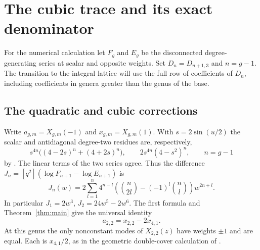 \section{The cubic trace and its exact denominator}\label{sec:arithmetic}
For the numerical calculation let $F_g$ and $E_g$ be the disconnected
degree-generating series at scalar and opposite weights. Set $D_n=D_{n+1,3}$
and $n=g-1$. The transition to the integral lattice will use the full
row of coefficients of $D_n$, including coefficients in genera greater
than the genus of the base.
\subsection{The quadratic and cubic corrections}

Write $a_{g,m}=X_{g,m}(-1)$ and $x_{g,m}=X_{g,m}(1)$.
With $s=2\sin(u/2)$ the scalar and antidiagonal degree-two residues
are, respectively,
\[
 s^{4n}\big((4-2s)^n+(4+2s)^n\big),\qquad
 2s^{4n}(4-s^2)^n,\qquad n=g-1
\]
by \cite[\S8]{BP}. The linear terms of the two series agree. Thus
the difference $J_n=[q^2](\log F_{n+1}-\log E_{n+1})$ is
\begin{equation}\label{eq:arith-two}
 J_n(w)=2\sum_{l=1}^n4^{n-l}
 \left(\binom n{2l}-(-1)^l\binom nl\right)w^{2n+l}.
\end{equation}
In particular $J_1=2w^3$, $J_2=24w^5-2w^6$. The first formula and
Theorem~\ref{thm:main} give the universal identity
\[
 a_{2,2}=x_{2,2}-2x_{4,1}.
\]
At this genus the only nonconstant modes of $X_{2,2}(z)$ have
weights $\pm1$ and are equal. Each is $x_{4,1}/2$, as in the
geometric double-cover calculation of \cite{WueProduct}.

